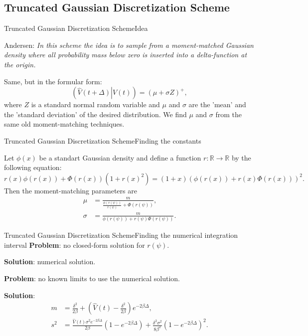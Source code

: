 \subsection{Truncated Gaussian Discretization Scheme}
    \begin{frame}{Truncated Gaussian Discretization Scheme}{Idea}
        \begin{block}{Andersen:}
            \emph{In this scheme the idea is to sample from a moment-matched Gaussian density where all probability
            mass below zero is inserted into a delta-function at the origin.}
        \end{block} 
        Same, but in the formular form:
        \begin{equation}
            \left(\left.\hat{V}(t+\Delta)\right| V(t)\right) = \left(\mu + \sigma Z\right)^+,
        \end{equation}
        where $Z$ is a standard normal random variable and $\mu$ and $\sigma$ are the 'mean' and the 'standard deviation' of the desired distribution.
        We find $\mu$ and $\sigma$ from the same old moment-matching techniques.
    \end{frame}

    \begin{frame}{Truncated Gaussian Discretization Scheme}{Finding the constants}
        \begin{proposition}
            Let $\phi(x)$ be a standart Gaussian density and define a function $r:\mathbb{R} \to \mathbb{R}$ by the following equation:
            \begin{equation}
                r(x)\phi(r(x))+\Phi(r(x))(1+r(x)^2)= (1+x)\left(\phi(r(x)) + r(x)\Phi(r(x))\right)^2.
            \end{equation}
            Then the moment-matching parameters are
            \begin{align}
                \mu &= \frac{m}{\frac{\phi(r(\psi))}{r(\psi)} + \Phi(r(\psi))},\\ 
                \sigma &= \frac{m}{\phi(r(\psi)) + r(\psi)\Phi(r(\psi))}.
            \end{align}
        \end{proposition}
    \end{frame}

    \begin{frame}{Truncated Gaussian Discretization Scheme}{Finding the numerical integration interval}
        \textbf{Problem}: no closed-form solution for $r(\psi)$. 
        
        \textbf{Solution}: numerical solution.

        \textbf{Problem}: no known limits to use the numerical solution.

        \textbf{Solution}: 
        \begin{align}
            m   &= \frac{\delta^2}{2\beta} + \left(\hat{V}(t) - \frac{\delta^2}{2\beta}\right)e^{-2\beta \Delta},\\
            s^2 &= \frac{\hat{V}(t)\sigma^2e^{-2\beta \Delta}}{2\beta}\left(1 - e^{-2\beta \Delta}\right) + \frac{\delta^2\sigma^2}{8\beta^2}\left(1 - e^{-2\beta \Delta}\right)^2.
        \end{align}
    \end{frame}

